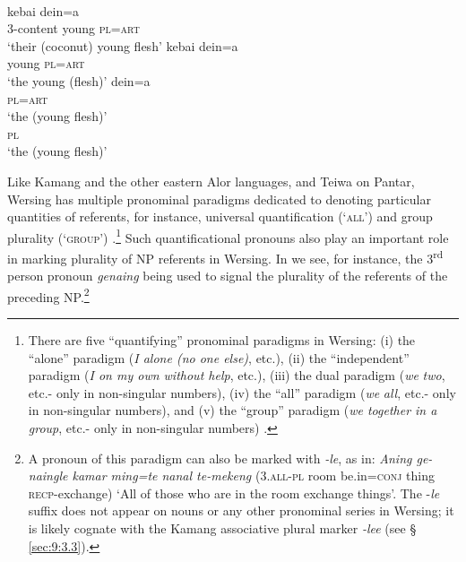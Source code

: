 \ea%
\label{ex:9:57}
 \\
\ea
{}    kebai dein=a\\
3-content young \textsc{pl=art}  \\
\glt `their (coconut) young flesh'
\ex
\gll kebai dein=a   \\
   young \textsc{pl=art}  \\
\glt `the young (flesh)' 
\ex
\gll dein=a   \\
   \textsc{pl=art}  \\
\glt  `the (young flesh)'
\ex
{}\\
    \textsc{pl}\\
\glt  `the (young flesh)'
\z
\z




Like Kamang and the other eastern Alor languages, and Teiwa on Pantar, Wersing has multiple pronominal paradigms dedicated to denoting particular quantities of referents, for instance, universal quantification (`\textsc{all')}  and group plurality (`\textsc{group}') .\footnote{There are five ``quantifying'' pronominal paradigms in Wersing: (i) the ``alone'' paradigm (\textit{I alone (no one else)}, etc.), (ii) the ``independent'' paradigm (\textit{I on my own without help}, etc.), (iii) the dual paradigm (\textit{we} \textit{two}, etc.- only in non-singular numbers), (iv) the ``all'' paradigm (\textit{we} \textit{all}, etc.- only in non-singular numbers), and (v) the ``group'' paradigm (\textit{we together in a group}, etc.- only in non-singular numbers) \citep{SchapperEtAltawersing}.} Such quantificational pronouns also play an important role in marking plurality of NP referents in Wersing. In  we see, for instance, the 3\textsuperscript{rd} person pronoun \textit{genaing} being
used to signal the plurality of the referents of the preceding NP.\footnote{A pronoun of this paradigm can also be marked with \textit{-le}, as in: \textit{Aning ge-naingle kamar ming=te nanal te-mekeng} (\textsc{3.all-pl} room be.in=\textsc{conj} thing \textsc{recp}-exchange) `All of those who are in the room exchange things'. The -\textit{le} suffix does not appear on nouns or any other pronominal series in Wersing; it is likely cognate with the Kamang associative plural marker \textit{-lee} (see {\S} \ref{sec:9:3.3}).}


